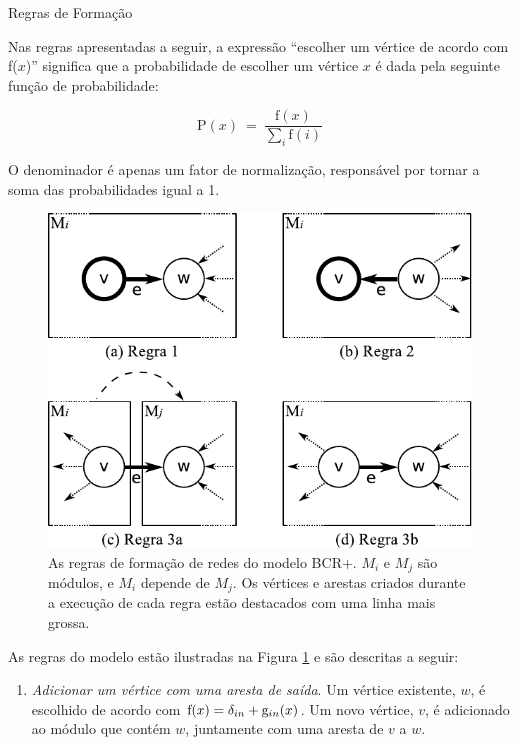 \begin{section}{Regras de Formação}


Nas regras apresentadas a seguir, a expressão ``escolher um vértice de acordo com f($x$)'' significa que a probabilidade de escolher um vértice $x$ é dada pela seguinte função de probabilidade:

$$
  \mathrm{P}(x) ~=~ \frac{ \mathrm{f}(x) }
  { \displaystyle\sum_{i} \mathrm{f}(i) }
$$

O denominador é apenas um fator de normalização, responsável por tornar a soma das probabilidades igual a 1.

\begin{figure}[htbp]
	\centering
		\includegraphics[scale=1]{figuras/regras-bcr}
	\caption{As regras de formação de redes do modelo BCR+. $M_i$ e $M_j$ são módulos, e $M_i$ depende de $M_j$. Os vértices e arestas criados durante a execução de cada regra estão destacados com uma linha mais grossa.}
	\label{fig:bcr-regras}
\end{figure}

As regras do modelo estão ilustradas na Figura \ref{fig:bcr-regras} e são descritas a seguir:

\begin{enumerate}

\item \emph{Adicionar um vértice com uma aresta de saída}. Um vértice existente, $w$, é escolhido de acordo com $\mathrm{f}(x) = \delta_{in} + \mathrm{g}_{in}(x)$. Um novo vértice, $v$, é adicionado ao módulo que contém $w$, juntamente com uma aresta de $v$ a $w$.


\end{enumerate}
\end{section}
